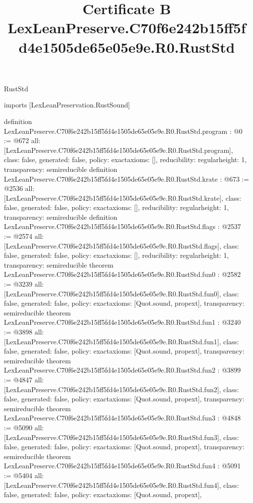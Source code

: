 \begin{lexlean}{RustStd}
\title{Certificate B LexLeanPreserve.C70f6e242b15ff5fd4e1505de65e05e9e.R0.RustStd}
\begin{coremodule}
imports [LexLeanPreservation.RustSound]

definition LexLeanPreserve.C70f6e242b15ff5fd4e1505de65e05e9e.R0.RustStd.program : @0 := @672 {
  all: [LexLeanPreserve.C70f6e242b15ff5fd4e1505de65e05e9e.R0.RustStd.program],
  class: false,
  generated: false,
  policy: exact{axioms: []},
  reducibility: regular{height: 1},
  transparency: semireducible
}
definition LexLeanPreserve.C70f6e242b15ff5fd4e1505de65e05e9e.R0.RustStd.krate : @673 := @2536 {
  all: [LexLeanPreserve.C70f6e242b15ff5fd4e1505de65e05e9e.R0.RustStd.krate],
  class: false,
  generated: false,
  policy: exact{axioms: []},
  reducibility: regular{height: 1},
  transparency: semireducible
}
definition LexLeanPreserve.C70f6e242b15ff5fd4e1505de65e05e9e.R0.RustStd.flags : @2537 := @2574 {
  all: [LexLeanPreserve.C70f6e242b15ff5fd4e1505de65e05e9e.R0.RustStd.flags],
  class: false,
  generated: false,
  policy: exact{axioms: []},
  reducibility: regular{height: 1},
  transparency: semireducible
}
theorem LexLeanPreserve.C70f6e242b15ff5fd4e1505de65e05e9e.R0.RustStd.fun0 : @2582 := @3239 {
  all: [LexLeanPreserve.C70f6e242b15ff5fd4e1505de65e05e9e.R0.RustStd.fun0],
  class: false,
  generated: false,
  policy: exact{axioms: [Quot.sound, propext]},
  transparency: semireducible
}
theorem LexLeanPreserve.C70f6e242b15ff5fd4e1505de65e05e9e.R0.RustStd.fun1 : @3240 := @3898 {
  all: [LexLeanPreserve.C70f6e242b15ff5fd4e1505de65e05e9e.R0.RustStd.fun1],
  class: false,
  generated: false,
  policy: exact{axioms: [Quot.sound, propext]},
  transparency: semireducible
}
theorem LexLeanPreserve.C70f6e242b15ff5fd4e1505de65e05e9e.R0.RustStd.fun2 : @3899 := @4847 {
  all: [LexLeanPreserve.C70f6e242b15ff5fd4e1505de65e05e9e.R0.RustStd.fun2],
  class: false,
  generated: false,
  policy: exact{axioms: [Quot.sound, propext]},
  transparency: semireducible
}
theorem LexLeanPreserve.C70f6e242b15ff5fd4e1505de65e05e9e.R0.RustStd.fun3 : @4848 := @5090 {
  all: [LexLeanPreserve.C70f6e242b15ff5fd4e1505de65e05e9e.R0.RustStd.fun3],
  class: false,
  generated: false,
  policy: exact{axioms: [Quot.sound, propext]},
  transparency: semireducible
}
theorem LexLeanPreserve.C70f6e242b15ff5fd4e1505de65e05e9e.R0.RustStd.fun4 : @5091 := @5404 {
  all: [LexLeanPreserve.C70f6e242b15ff5fd4e1505de65e05e9e.R0.RustStd.fun4],
  class: false,
  generated: false,
  policy: exact{axioms: [Quot.sound, propext]},
}
\end{coremodule}
\end{lexlean}
